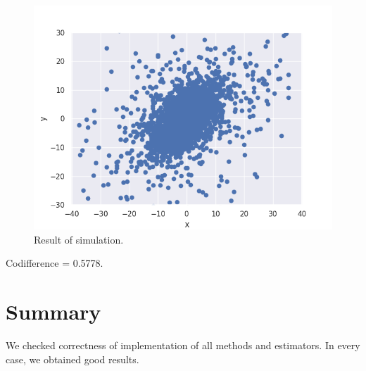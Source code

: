 \documentclass{article}
\begin{document}
	\begin{figure}[H]
		\centering
		\includegraphics[width=1\linewidth]{images/ex_5_3_alpha_stable_vector_simulation_continuous_scatter}
		\caption{Result of simulation.}\label{15}
	\end{figure}
	
	Codifference = 0.5778.
	
	
	
	\section{Summary}
	We checked correctness of implementation of all methods and estimators. In every case, we obtained good results.
	
\end{document}
